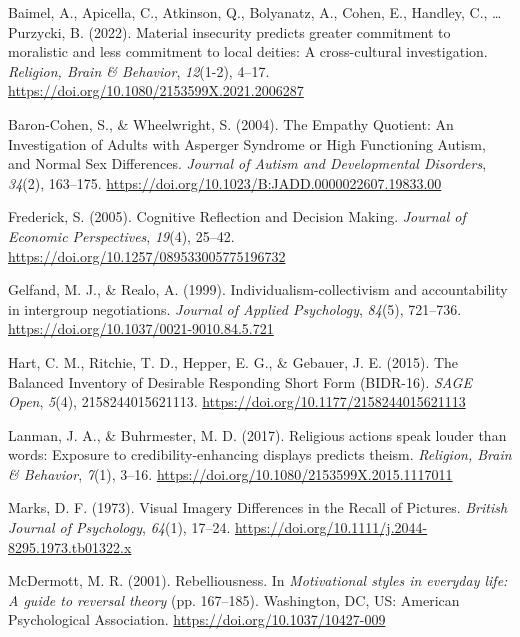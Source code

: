 \documentclass[
  letterpaper,
]{scrbook}
\newlength{\cslhangindent}
\newenvironment{CSLReferences}[2] %
 {\begin{list}{}{%
  \setlength{\itemindent}{0pt}
  \setlength{\leftmargin}{0pt}
  \setlength{\parsep}{0pt}
  \ifodd #1
   \setlength{\leftmargin}{\cslhangindent}
   \setlength{\itemindent}{-1\cslhangindent}
  \fi
  \setlength{\itemsep}{#2\baselineskip}}}
 {\end{list}}
\begin{document}
\label{refs}
\begin{CSLReferences}{1}{0}
Baimel, A., Apicella, C., Atkinson, Q., Bolyanatz, A., Cohen, E.,
Handley, C., \ldots{} Purzycki, B. (2022). Material insecurity predicts
greater commitment to moralistic and less commitment to local deities: A
cross-cultural investigation. \emph{Religion, Brain \& Behavior},
\emph{12}(1-2), 4--17.
\url{https://doi.org/10.1080/2153599X.2021.2006287}

Baron-Cohen, S., \& Wheelwright, S. (2004). The {Empathy Quotient}: {An
Investigation} of {Adults} with {Asperger Syndrome} or {High Functioning
Autism}, and {Normal Sex Differences}. \emph{Journal of Autism and
Developmental Disorders}, \emph{34}(2), 163--175.
\url{https://doi.org/10.1023/B:JADD.0000022607.19833.00}

Frederick, S. (2005). Cognitive {Reflection} and {Decision Making}.
\emph{Journal of Economic Perspectives}, \emph{19}(4), 25--42.
\url{https://doi.org/10.1257/089533005775196732}

Gelfand, M. J., \& Realo, A. (1999). Individualism-collectivism and
accountability in intergroup negotiations. \emph{Journal of Applied
Psychology}, \emph{84}(5), 721--736.
\url{https://doi.org/10.1037/0021-9010.84.5.721}

Hart, C. M., Ritchie, T. D., Hepper, E. G., \& Gebauer, J. E. (2015).
The {Balanced Inventory} of {Desirable Responding Short Form}
({BIDR-16}). \emph{SAGE Open}, \emph{5}(4), 2158244015621113.
\url{https://doi.org/10.1177/2158244015621113}

Lanman, J. A., \& Buhrmester, M. D. (2017). Religious actions speak
louder than words: Exposure to credibility-enhancing displays predicts
theism. \emph{Religion, Brain \& Behavior}, \emph{7}(1), 3--16.
\url{https://doi.org/10.1080/2153599X.2015.1117011}

Marks, D. F. (1973). Visual {Imagery Differences} in the {Recall} of
{Pictures}. \emph{British Journal of Psychology}, \emph{64}(1), 17--24.
\url{https://doi.org/10.1111/j.2044-8295.1973.tb01322.x}

McDermott, M. R. (2001). Rebelliousness. In \emph{Motivational styles in
everyday life: {A} guide to reversal theory} (pp. 167--185).
{Washington, DC, US}: {American Psychological Association}.
\url{https://doi.org/10.1037/10427-009}


\end{CSLReferences}
\end{document}
